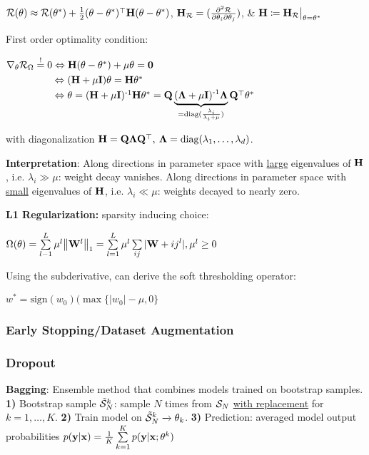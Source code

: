         \tab$\mathcal{R}(\theta)\approx\mathcal{R}(\theta^*)+\frac{1}{2}(\theta-\theta^*)^{\mathop{\mathrm{\top}}}\mathbf H(\theta-\theta^*)$, $\mathbf H_{\mathcal{R}}=(\frac{\partial^2\mathcal{R}}{\partial\theta_i\partial\theta_j})$, \& $\mathbf H\coloneqq\mathbf H_{\mathcal{R}}\bigr|_{\theta=\theta^*}$
        
        First order optimality condition:
        
        \tab$\nabla_\theta\mathcal{R}_\Omega\overset{!}{=}0\Leftrightarrow\mathbf H(\theta-\theta^*)+\mu\theta=\mathbf{0}$\\
        \tab$\phantom{\nabla_\theta\cR_\Omega\overset{!}{=}0}\Leftrightarrow(\vH+\mu\vI)\theta=\vH\theta^*$\\
        \tab$\phantom{\nabla_\theta\cR_\Omega\overset{!}{=}0}\Leftrightarrow\theta=(\vH+\mu\vI)\inv\vH\theta^*=\vQ\underbrace{(\vLa+\mu\vI)\inv\vLa}_{=\text{diag}(\frac{\lambda_i}{\lambda_i+\mu})}\vQ\T\theta^*$
        
        \tab with diagonalization $\mathbf H=\mathbf Q\mathbf \Lambda\mathbf Q^{\mathop{\mathrm{\top}}},\>\mathbf \Lambda=\text{diag}(\lambda_1,\ldots,\lambda_d)$.
        
        \textbf{Interpretation}: Along directions in parameter space with \underline{large} eigenvalues of $\mathbf H$, i.e. $\lambda_i\gg\mu$: weight decay vanishes. Along directions in parameter space with \underline{small} eigenvalues of $\mathbf H$, i.e. $\lambda_i\ll\mu$: weights decayed to nearly zero.
        
    
        \textbf{L1 Regularization:} sparsity inducing choice:
        
        $\Omega(\theta)=\sum\limits_{l-1}^L\mu^l\norm{\mathbf W^l}_1=\sum\limits_{l=1}^L\mu^l\sum\limits_{ij}|\mathbf W+{ij}^l|, \mu^l\geq0$
        
        Using the subderivative, can derive the soft thresholding operator:
        
        $w^*=\text{sign}(w_0)(\max\{|w_0| -\mu, 0\}$
    
    \subsubsection{Early Stopping/Dataset Augmentation}
    \label{ssub:datasetaugmentation}
    
    \subsubsection{Dropout}
    \label{ssub:dropout}
    \textbf{Bagging}: Ensemble method that combines models trained on bootstrap samples. \textbf{1)} Bootstrap sample $\Tilde{\mathcal{S}}^k_N$: sample $N$ times from $\mathcal{S}_N$ \underline{with replacement} for $k=1,\ldots,K$. \textbf{2)} Train model on $\Tilde{\mathcal{S}}^k_N\xrightarrow{}\theta_k$. \textbf{3)} Prediction: averaged model output probabilities $p(\mathbf y|\mathbf x)=\frac{1}{K}\sum\limits^K_{k=1}p(\mathbf y|\mathbf x;\theta^k)$
    
